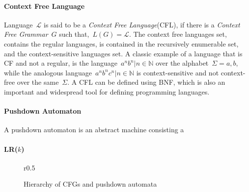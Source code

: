 \paragraph{Context Free Language}
Language~$\mathcal{L}$ is said to be a \emph{Context Free Language}(CFL), if there
  is a \emph{Context Free Grammar}~$G$ such that,~$L(G)=\mathcal{L}$.
The context free languages set, contains the regular languages, 
  is contained in the recursively enumerable set, and the context-sensitive languages set.
A classic example of a language that is CF and not a regular, 
  is the language~${a^nb^n|n\in\mathbb{N}}$ over the alphabet~$\Sigma={a,b}$,
  while the analogous language~${a^nb^nc^n|n\in\mathbb{N}}$ is context-sensitive 
  and not context-free over the same~$\Sigma$.
A CFL can be defined using BNF, which is also an important and widespread tool for 
  defining programming languages.
\paragraph{Pushdown Automaton}
A pushdown automaton is an abstract machine consisting a 
\paragraph{LR($k$)}
\begin{wrapfigure}r{0.5\linewidth}
  \caption{Hierarchy of CFGs and pushdown automata}
  
\end{wrapfigure}
